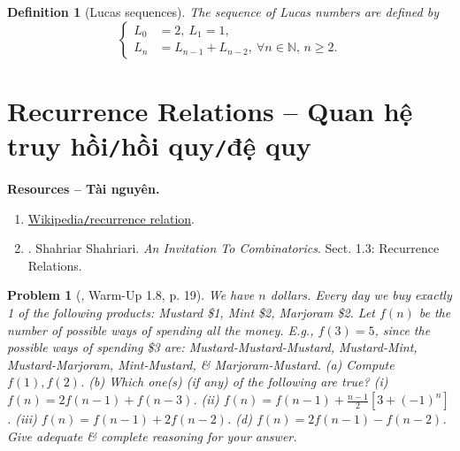 \documentclass[oneside]{book}
\newtheorem{definition}{Definition}
\newtheorem{problem}{Problem}
\begin{document}
\begin{definition}[Lucas sequences]
	The sequence of {\sf Lucas numbers} are defined by
	\begin{equation*}
		\left\{\begin{split}
			L_0 &= 2,\ L_1 = 1,\\
			L_n &= L_{n - 1} + L_{n - 2},\ \forall n\in\mathbb{N},\,n\ge2.
		\end{split}\right.
	\end{equation*}
\end{definition}


\section{Recurrence Relations -- Quan hệ truy hồi{\tt/}hồi quy{\tt/}đệ quy}
\textbf{\textsf{Resources -- Tài nguyên.}}
\begin{enumerate}
	\item \href{https://en.wikipedia.org/wiki/Recurrence_relation}{Wikipedia{\tt/}recurrence relation}.
	\item \cite{Shahriari2022}. {\sc Shahriar Shahriari}. {\it An Invitation To Combinatorics}. Sect. 1.3: Recurrence Relations.
\end{enumerate}

\begin{problem}[\cite{Shahriari2022}, Warm-Up 1.8, p. 19]
	We have $n$ dollars. Every day we buy exactly 1 of the following products: Mustard \$1, Mint \$2, Marjoram \$2. Let $f(n)$ be the number of possible ways of spending all the money. E.g., $f(3) = 5$, since the possible ways of spending \$3 are: Mustard-Mustard-Mustard, Mustard-Mint, Mustard-Marjoram, Mint-Mustard, \& Marjoram-Mustard. (a) Compute $f(1),f(2)$. (b) Which one(s) (if any) of the following are true? (i) $f(n) = 2f(n - 1) + f(n - 3)$. (ii) $f(n) = f(n - 1) + \frac{n - 1}{2}[3 + (-1)^n]$. (iii) $f(n) = f(n - 1) + 2f(n - 2)$. (d) $f(n) = 2f(n - 1) - f(n - 2)$. Give adequate \& complete reasoning for your answer.
\end{problem}
\end{document}
